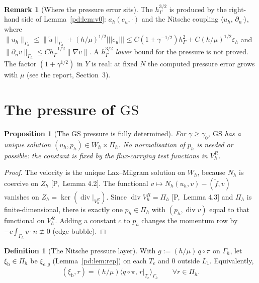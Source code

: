 \documentclass[11pt,reqno]{amsart}
\theoremstyle{plain}
\newtheorem{proposition}[theorem]{Proposition}
\theoremstyle{definition}
\newtheorem{definition}[theorem]{Definition}
\newtheorem{remark}[theorem]{Remark}
\newcommand{\hG}{h_\Gamma}
\newcommand{\Gh}{\Gamma_h}
\newcommand{\VR}{V_h^R}
\newcommand{\Pih}{\Pi_h}
\newcommand{\Zh}{Z_h}
\newcommand{\Wh}{W_h}
\newcommand{\dn}{\partial_n}
\newcommand{\ut}{\tilde u}
\newcommand{\ft}{\tilde f}
\newcommand{\ip}[2]{\langle #1,\, #2\rangle}
\newcommand{\tnorm}[1]{|\!|\!|#1|\!|\!|}
\newcommand{\norm}[1]{\lVert #1\rVert}
\newcommand{\GS}{\mathrm{GS}}
\newcommand{\eps}{\varepsilon_h}
\renewcommand{\div}{\operatorname{div}}
\newcommand{\Pref}[1]{\textup{[P,~#1]}}
\newcommand{\Lay}{L_1}
\newcommand{\xib}{\xi_{\mathrm b}}
\begin{document}
\begin{remark}[Where the pressure error sits]\label{pd:rem:cnsp}
The $\hG^{3/2}$ is produced by the right-hand side of Lemma~\ref{pd:lem:v0}: $a_h(e_u,\cdot)$ and the Nitsche coupling $\ip{u_h}{\dn\cdot}$, where $\norm{u_h}_{\Gh}\le\norm\ut_{\Gh}+(h/\mu)^{1/2}\tnorm{e_u}\le C(1+\gamma^{-1/2})\hG^2+C(h/\mu)^{1/2}\eps$ and $\norm{\dn v}_{\Gh}\le C\hG^{-1/2}\norm{\nabla v}$. A $\hG^{3/2}$ \emph{lower} bound for the pressure is not proved. The factor $(1+\gamma^{1/2})$ in $Y$ is real: at fixed $N$ the computed pressure error grows with $\mu$ (see the report, Section~3).
\end{remark}

\section{The pressure of \texorpdfstring{$\GS$}{GS}}\label{pd:sec:gsp}

\begin{proposition}[The $\GS$ pressure is fully determined]\label{pd:prop:gsunique}
For $\gamma\ge\gamma_0$, $\GS$ has a unique solution $(u_h,p_h)\in\Wh\times\Pih$. No normalisation of $p_h$ is needed or possible: the constant is fixed by the flux-carrying test functions in $\VR$.
\end{proposition}

\begin{proof}
The velocity is the unique Lax--Milgram solution on $\Wh$, because $N_h$ is coercive on $\Zh$ \Pref{Lemma 4.2}. The functional $v\mapsto N_h(u_h,v)-(\ft,v)$ vanishes on $\Zh=\ker(\div|_{\VR})$. Since $\div\VR=\Pih$ \Pref{Lemma 4.3} and $\Pih$ is finite-dimensional, there is exactly one $p_h\in\Pih$ with $(p_h,\div v)$ equal to that functional on $\VR$. Adding a constant $c$ to $p_h$ changes the momentum row by $-c\int_{\Gh}v\cdot n\not\equiv0$ (edge bubble).
\end{proof}

\begin{definition}[The Nitsche pressure layer]\label{pd:def:xib}
With $g:=(h/\mu)\,q\circ\pi$ on $\Gh$, let $\xib\in\Pih$ be $\xi_{e,g}$ (Lemma~\ref{pd:lem:rep}) on each $T_e$ and $0$ outside $\Lay$. Equivalently,
\[
(\xib,r)=(h/\mu)\ip{q\circ\pi}{r|_{T_e}}_{\Gh}\qquad\forall r\in\Pih .
\]
\end{definition}
\end{document}
